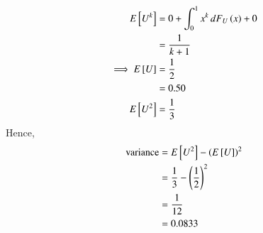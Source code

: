 \documentclass[journal,12pt,twocolumn]{IEEEtran}
\begin{document}
\begin{align}
    E{}\left[U^k\right] &=  0 + \int_{0}^{1} x^k \,dF_{U}\left(x\right) + 0 \\
                 &= \frac{1}{k + 1}  \\
    \implies E{}\left[U\right] &= \frac{1}{2}\\
                        &= 0.50 \\
             E{}\left[U^2\right] &= \frac{1}{3}
\end{align}
Hence,
\begin{align}
    \text{variance} &= E{}\left[U^2\right] - \left(E{}\left[U\right]\right)^2 \\
                    &= \frac{1}{3} - \left(\frac{1}{2}\right)^2 \\
                    &= \frac{1}{12} \\
                    &= 0.0833
\end{align}
\end{document}
